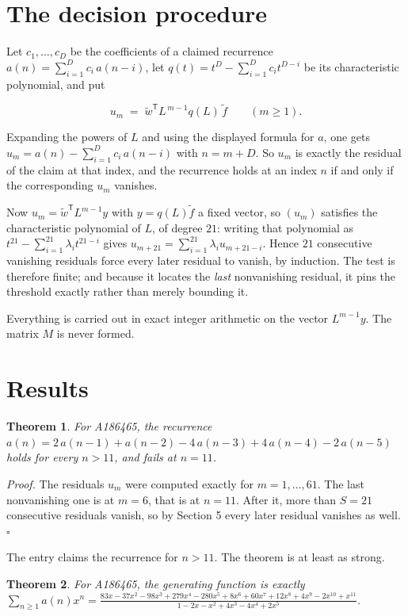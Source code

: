 \documentclass[11pt]{article}
\newtheorem{theorem}{Theorem}
\theoremstyle{definition}
\begin{document}
\section{The decision procedure}

Let $c_1,\dots,c_D$ be the coefficients of a claimed recurrence $a(n) = \sum_{i=1}^{D} c_i\,a(n-i)$, let $q(t) = t^{D} - \sum_{i=1}^{D} c_i t^{D-i}$ be its characteristic polynomial, and put

\[u_m \;=\; \tilde w^{\mathsf T} L^{\,m-1} q(L)\,\tilde f \qquad (m \ge 1).\]

Expanding the powers of $L$ and using the displayed formula for $a$, one gets $u_m = a(n) - \sum_{i=1}^{D} c_i\,a(n-i)$ with $n = m + D$. So $u_m$ is exactly the residual of the claim at that index, and the recurrence holds at an index $n$ if and only if the corresponding $u_m$ vanishes.

Now $u_m = \tilde w^{\mathsf T} L^{m-1} y$ with $y = q(L)\tilde f$ a fixed vector, so $(u_m)$ satisfies the characteristic polynomial of $L$, of degree $21$: writing that polynomial as $t^{21} - \sum_{i=1}^{21} \lambda_i t^{21-i}$ gives $u_{m+21} = \sum_{i=1}^{21} \lambda_i u_{m+21-i}$. Hence $21$ consecutive vanishing residuals force every later residual to vanish, by induction. The test is therefore finite; and because it locates the {\itshape last} nonvanishing residual, it pins the threshold exactly rather than merely bounding it.

Everything is carried out in exact integer arithmetic on the vector $L^{m-1}y$. The matrix $M$ is never formed.

\section{Results}

\begin{theorem} For A186465, the recurrence $a(n) = 2\,a(n-1) + a(n-2) - 4\,a(n-3) + 4\,a(n-4) - 2\,a(n-5)$ holds for every $n > 11$, and fails at $n = 11$.\end{theorem}

{\itshape Proof.} The residuals $u_m$ were computed exactly for $m = 1,\dots,61$. The last nonvanishing one is at $m = 6$, that is at $n = 11$. After it, more than $S = 21$ consecutive residuals vanish, so by Section 5 every later residual vanishes as well. $\square$

The entry claims the recurrence for $n > 11$. The theorem is at least as strong.

\begin{theorem} For A186465, the generating function is exactly $\sum_{n\ge 1} a(n)x^n = \frac{83x - 37x^{2} - 98x^{3} + 279x^{4} - 280x^{5} + 8x^{6} + 60x^{7} + 12x^{8} + 4x^{9} - 2x^{10} + x^{11}}{1 - 2x - x^{2} + 4x^{3} - 4x^{4} + 2x^{5}}$.\end{theorem}
\end{document}
